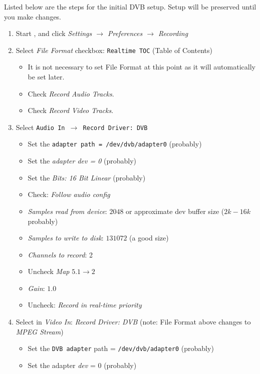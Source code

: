 Listed below are the steps for the initial DVB setup.  Setup will be preserved until you make changes.

\begin{enumerate}
    \item Start \CGG{}, and click \textit{Settings $\rightarrow$ Preferences $\rightarrow$ Recording}
    \item Select \textit{File Format} checkbox: \texttt{Realtime TOC} (Table of Contents)
    \begin{itemize}
        \item It is not necessary to set File Format at this point as it will automatically be set later.
        \item Check \textit{Record Audio Tracks}.
        \item Check \textit{Record Video Tracks}.
    \end{itemize}
    \item Select \texttt{Audio In $\rightarrow$ Record Driver: DVB}
    \begin{itemize}
        \item Set the \texttt{adapter path = /dev/dvb/adapter0} (probably)
        \item Set the \textit{adapter dev = 0} (probably)
        \item Set the \textit{Bits: 16 Bit Linear} (probably)
        \item Check: \textit{Follow audio config}
        \item \textit{Samples read from device}: $2048$ or approximate dev buffer size ($2k-16k$ probably)
        \item \textit{Samples to write to disk}: $131072$ (a good size)
        \item \textit{Channels to record}: 2
        \item Uncheck \textit{Map} $5.1 \rightarrow 2$
        \item \textit{Gain}: $1.0$
        \item Uncheck: \textit{Record in real-time priority}
    \end{itemize}
    \item Select in \textit{Video In}: \qquad \textit{Record Driver: DVB} (note: File Format above changes to \textit{MPEG Stream})
    \begin{itemize}
        \item Set the \texttt{DVB adapter} path = \texttt{/dev/dvb/adapter0} (probably)
        \item Set the adapter \textit{dev} = 0 (probably)

\end{itemize}
\end{enumerate}
